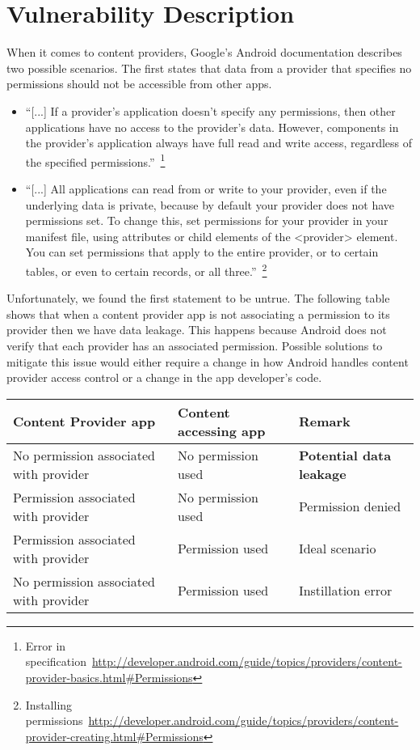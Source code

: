 \section{Vulnerability Description}
\label{vuln}
When it comes to content providers, Google's Android documentation
describes two possible scenarios. The first states that data from
a provider
that specifies no permissions should not be accessible from other apps.
\begin{itemize}
 \item ``[...] If a provider's application doesn't specify any permissions, then other applications have no access to the provider's data. However, components in the provider's application always have full read and write access, regardless of the specified permissions.''~\footnote{Error in specification~\url{http://developer.android.com/guide/topics/providers/content-provider-basics.html#Permissions}}
 \item ``[...] All applications can read from or write to your provider, even if the underlying data is private, because by default your provider does not have permissions set. To change this, set permissions for your provider in your manifest file, using attributes or child elements of the <provider> element. You can set permissions that apply to the entire provider, or to certain tables, or even to certain records, or all three.''~\footnote{Installing permissions~\url{http://developer.android.com/guide/topics/providers/content-provider-creating.html#Permissions}}
\end{itemize}

Unfortunately, we found the first statement to be untrue. The following table shows that when a content provider app is not associating a permission to its provider then we have data leakage. This happens because Android does not verify that each provider has an associated permission. Possible solutions to mitigate this issue would either require a change in how Android handles content provider access control or a change in the app developer's code.

\begin{center}
	\begin{tabular}{ | p{2.5cm} | p{2.5cm} | p{2cm} | }
		\hline
		\textbf{Content Provider app} & \textbf{Content accessing app} & \textbf{Remark} \\
		\hline \hline
		No permission associated with provider & No permission used & \textcolor[rgb]{0.55,0,0}{\textbf{Potential data leakage}} \\
		\hline
		Permission associated with provider & No permission used & Permission denied \\
		\hline
		Permission associated with provider & Permission used & \textcolor[rgb]{0,0.33,0}{Ideal scenario} \\
		\hline
		No permission associated with provider & Permission used & Instillation error \\
		\hline
	\end{tabular}
\end{center}
